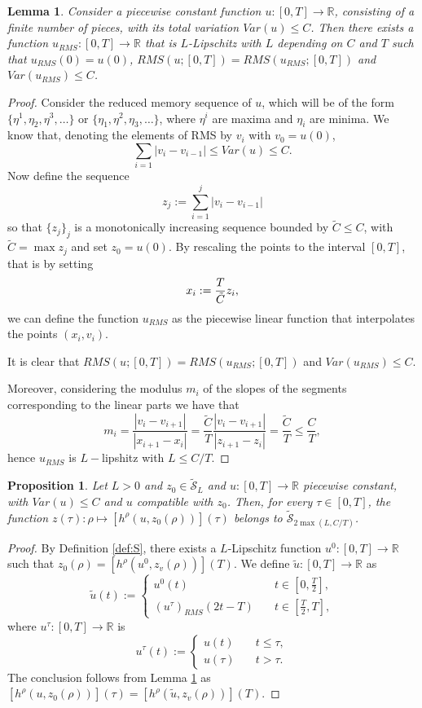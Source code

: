 \documentclass[12pt]{article}
\newcommand{\R}{\mathbb{R}}
\newcommand{\1}{\mathds{1}}
\newtheorem{prop}[teo]{Proposition}
\newtheorem{lem}[teo]{Lemma}
\theoremstyle{definition}
\begin{document}
\begin{lem}\label{lemma: propPreis1}
    Consider a piecewise constant function $u:[0,T]\to\R$, consisting of a finite number of pieces, with its total variation $Var(u)\leq C$. Then there exists a function $u_{RMS}:[0,T]\to \R$ that is $L$-Lipschitz with $L$ depending on $C$ and $T$ such that $u_{RMS} (0)=u(0)$, $RMS(u;[0,T])=RMS(u_{RMS};[0,T])$ and $Var(u_{RMS})\leq C$.
\end{lem}
\begin{proof}
    Consider the reduced memory sequence of $u$, which will be of the form $\{\eta^1,\eta_2,\eta^3,\dots\}$ or $\{\eta_1,\eta^2,\eta_3,\dots\}$, where $\eta^i$ are maxima and $\eta_i$ are minima. We know that, denoting the elements of RMS by $v_i$ with $v_0=u(0)$, \[\sum_{i=1} |v_{i}-v_{i-1}|\leq Var(u)\leq C.\]
    Now define the sequence \[z_j:= \sum_{i=1}^{j}|v_i-v_{i-1}|\] so that $\{z_j\}_j$ is a monotonically increasing sequence bounded by $\tilde{C}\leq C$, with $\tilde{C} = \max z_j$ and set $z_0=u(0).$ By rescaling the points to the interval $[0,T]$, that is by setting
    \[
    x_i:= \frac{T}{\Tilde{C}} z_i,
    \] 
    we can define the function $u_{RMS}$ as the piecewise linear function that interpolates the points $(x_i,v_i)$. \par 
    It is clear that $RMS(u;[0,T])=RMS(u_{RMS};[0,T])$ and $Var(u_{RMS})\leq C$. \par
    Moreover, considering the modulus $m_i$ of the slopes of the segments corresponding to the linear parts we have that
    \[m_i = \frac{|v_i-v_{i+1}|}{|x_{i+1}-x_i|} = \frac{\tilde{C}}{T} \frac{|v_i-v_{i+1}|}{|z_{i+1}-z_i|} = \frac{\tilde{C}}{T} \leq \frac{C}{T},\]
    hence $u_{RMS}$ is $L-$lipshitz with $L\leq C/T$.
\end{proof}

\begin{prop}\label{prop: Ltilda}
Let $L>0$ and $z_0\in\tilde{\mathcal S}_L$ and $u:[0,T]\to\mathbb{R}$ piecewise constant, with $Var(u)\le C$ and $u$ compatible with $z_0$. Then, for every $\tau\in[0,T]$, the function $z(\tau):\rho\mapsto [h^\rho(u,z_0(\rho))](\tau)$ belongs to $\tilde{\mathcal S}_{2\max(L,C/T)}$.
\end{prop}

\begin{proof}
By Definition \ref{def:S}, there exists a $L$-Lipschitz function $u^0:[0,T]\to\mathbb{R}$ such that $z_0(\rho)=[h^\rho(u^0,z_v(\rho))](T)$. We define $\tilde{u}:[0,T] \to \R$ as \[\tilde{u}(t):=\begin{cases}
    u^0(t) \quad & t\in \left[0,\frac{T}{2}\right],\\
    (u^{\tau})_{RMS}(2t-T) \quad & t\in \left[\frac{T}{2}, T\right],
\end{cases}\] where $u^{\tau}:[0,T]\to \R$ is \[u^\tau(t):=\begin{cases}
    u(t) \quad& t\leq \tau,\\
    u(\tau) \quad& t>\tau.
\end{cases}\] The conclusion follows from Lemma \ref{lemma: propPreis1} as $[h^\rho(u,z_0(\rho))](\tau) = [h^\rho(\tilde{u},z_v(\rho))](T)$.


\end{proof}
\end{document}
